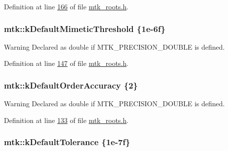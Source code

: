 Definition at line \hyperlink{mtk__roots_8h_source_l00166}{166} of file \hyperlink{mtk__roots_8h_source}{mtk\+\_\+roots.\+h}.

\hypertarget{group__c01-roots_ga35718d949bdc81a08a9cc8ebbe3478a2}{
\subsubsection[{k\+Default\+Mimetic\+Threshold}]{\setlength{\rightskip}{0pt plus 5cm}mtk\+::k\+Default\+Mimetic\+Threshold \{1e-\/6f\}}}\label{group__c01-roots_ga35718d949bdc81a08a9cc8ebbe3478a2}
\begin{DoxyWarning}{Warning}
Declared as double if M\+T\+K\+\_\+\+P\+R\+E\+C\+I\+S\+I\+O\+N\+\_\+\+D\+O\+U\+B\+L\+E is defined. 
\end{DoxyWarning}


Definition at line \hyperlink{mtk__roots_8h_source_l00147}{147} of file \hyperlink{mtk__roots_8h_source}{mtk\+\_\+roots.\+h}.

\hypertarget{group__c01-roots_ga0d95560098eb36420511103637b6952f}{
\subsubsection[{k\+Default\+Order\+Accuracy}]{\setlength{\rightskip}{0pt plus 5cm}mtk\+::k\+Default\+Order\+Accuracy \{2\}}}\label{group__c01-roots_ga0d95560098eb36420511103637b6952f}
\begin{DoxyWarning}{Warning}
Declared as double if M\+T\+K\+\_\+\+P\+R\+E\+C\+I\+S\+I\+O\+N\+\_\+\+D\+O\+U\+B\+L\+E is defined. 
\end{DoxyWarning}


Definition at line \hyperlink{mtk__roots_8h_source_l00133}{133} of file \hyperlink{mtk__roots_8h_source}{mtk\+\_\+roots.\+h}.

\hypertarget{group__c01-roots_gae914b125d81d1b97e0aee7bbc7739786}{
\subsubsection[{k\+Default\+Tolerance}]{\setlength{\rightskip}{0pt plus 5cm}mtk\+::k\+Default\+Tolerance \{1e-\/7f\}}}\label{group__c01-roots_gae914b125d81d1b97e0aee7bbc7739786}


